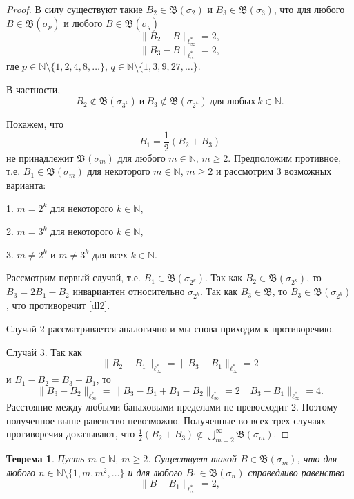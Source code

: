\documentclass[12pt]{article}
\newtheorem{thm}{Теорема}
\def\N{{\mathbb{N}}}
\def\B{{\mathfrak{B}}}
\begin{document}
\begin{proof}
В силу \cite[Теорема 10]{ASSU2} существуют такие $B_2\in \mathfrak B(\sigma_2)$ и $B_3\in \mathfrak B(\sigma_3)$, что для любого $B\in \mathfrak B(\sigma_p)$ и любого $B\in \mathfrak B(\sigma_q)$
\begin{equation}\label{dl1}
\|B_2-B\|_{\ell_\infty^*}=2,
\end{equation}
\begin{equation}\label{dl11}
\|B_3-B\|_{\ell_\infty^*}=2,
\end{equation}
где $p\in \N \setminus \{1,2,4,8,\dots\}$, $q\in \N \setminus \{1,3,9,27,\dots\}$.

В частности,
\begin{equation}\label{dl2}
B_2 \notin \mathfrak B(\sigma_{3^k}) \ \text{и} \ B_3 \notin \mathfrak B(\sigma_{2^k}) \ \text{для любых} \ k\in \N.
\end{equation}

Покажем, что
$$B_1 = \frac12(B_2+B_3)$$
не принадлежит $\mathfrak B(\sigma_m)$ для любого $m\in \N$, $m\ge 2$. Предположим противное, т.е. $B_1 \in\mathfrak B(\sigma_m)$ для некоторого $m\in \N$, $m\ge2$ и рассмотрим 3 возможных варианта:

1. $m=2^k$ для некоторого $k\in \N$,

2. $m=3^k$ для некоторого $k\in \N$,

3. $m\neq 2^k$ и $m\neq 3^k$ для всех $k\in \N$.

Рассмотрим первый случай, т.е. $B_1 \in\mathfrak B(\sigma_{2^k})$. Так как $B_2 \in\mathfrak B(\sigma_{2^k})$, то  $B_3=2B_1-B_2$ инвариантен относительно $\sigma_{2^k}$. Так как $B_3 \in\mathfrak B$, то $B_3 \in\mathfrak B(\sigma_{2^k})$, что противоречит \eqref{dl2}.

Случай 2 рассматривается аналогично и мы снова приходим к противоречию.

Случай 3. Так как
$$\|B_2-B_1\|_{\ell_\infty^*}=\|B_3-B_1\|_{\ell_\infty^*}=2$$
и $B_1-B_2=B_3-B_1$, то
$$\|B_3-B_2\|_{\ell_\infty^*}=\|B_3-B_1+B_1-B_2\|_{\ell_\infty^*}=2\|B_3-B_1\|_{\ell_\infty^*}=4.$$
Расстояние между любыми банаховыми пределами не превосходит 2. Поэтому полученное выше равенство невозможно. Полученные во всех трех случаях противоречия доказывают, что $\frac12(B_2+B_3)\notin \bigcup_{m=2}^\infty\mathfrak B(\sigma_m)$.
\end{proof}

\begin{thm}
Пусть $m\in \N$, $m\ge2$. Существует такой $B\in \B(\sigma_m)$, что для любого $n\in \N\setminus\{1, m, m^2,\dots\}$ и для любого $B_1\in \B(\sigma_n)$ справедливо равенство
\begin{equation*}\label{dl3}
\|B-B_1\|_{\ell_\infty^*}=2,
\end{equation*}
\end{thm}
\end{document}
